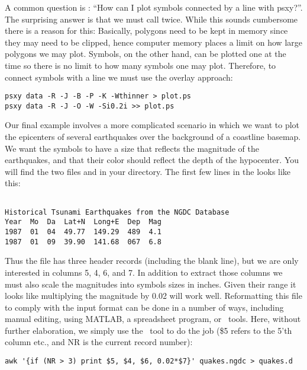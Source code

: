 \documentclass{report}
\begin{document}
A common question is : ``How can I plot symbols connected by a line
with psxy?''.  The surprising answer is that we must call  twice.
While this sounds cumbersome there is a reason for this:  Basically,
polygons need to be kept in memory since they may need to be clipped,
hence computer memory places a limit on how large polygons we may plot.
Symbols, on the other hand, can be plotted one at the time so there
is no limit to how many symbols one may plot.  Therefore, to connect
symbols with a line we must use the overlay approach:

{\small\begin{verbatim} 
psxy data -R -J -B -P -K -Wthinner > plot.ps
psxy data -R -J -O -W -Si0.2i >> plot.ps
\end{verbatim}
}

Our final  example involves a more complicated scenario
in which we want to plot the epicenters of several earthquakes over
the background of a coastline basemap.  We want the symbols to have a
size that reflects the magnitude of the earthquakes, and that their
color should reflect the depth of the hypocenter.  You will find the
two files  and  in your
directory.  The first few lines in the  looks
like this:\par 

{\small\begin{verbatim}

Historical Tsunami Earthquakes from the NGDC Database
Year  Mo  Da  Lat+N  Long+E  Dep  Mag
1987  01  04  49.77  149.29  489  4.1
1987  01  09  39.90  141.68  067  6.8
\end{verbatim}
}

Thus the file has three header records (including the blank line),
but we are only interested in columns 5, 4, 6, and 7.  In addition to
extract those columns we must also scale the magnitudes into symbols
sizes in inches.  Given their range it looks like multiplying the
magnitude by 0.02 will work well.  Reformatting this file to comply
with the  input format can be done in a number of ways,
including manual editing, using MATLAB, a spreadsheet program, or \UNIX\
tools.  Here, without further elaboration, we simply use the \UNIX\ tool
\progname{awk} to do the job (\$5 refers to the 5'th column etc., and NR
is the current record number):

{\small\begin{verbatim}
awk '{if (NR > 3) print $5, $4, $6, 0.02*$7}' quakes.ngdc > quakes.d
\end{verbatim}
}
\end{document}
